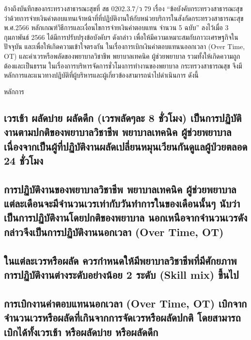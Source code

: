 อ้างถึงบันทึกของกระทรวงสาธารณะสุขที่ สธ 0202.3.7/ว 79 เรื่อง “ข้อบังคับกระทรวงสาธารณะสุขว่าด้วยการจ่ายเงินค่าตอบแทนเจ้าหน้าที่ที่ปฏิบัติงานให้กับหน่วยบริการในสังกัดกระทรวงสาธารณะสุข พ.ศ.2566 หลักเกณฑ์วิธีการและเงื่อนไขการจ่ายเงินค่าตอบแทน จำนวน 5 ฉบับ” ลงไว้เมื่อ 3 กุมภาพันธ์ 2566 ได้มีการปรับปรุงข้อบังคับฯ ดังกล่าว เพื่อให้มีความเหมาะสมกับภาวะเศรษฐกิจในปัจจุบัน และเพื่อให้เกิดความเข้าใจตรงกัน ในเรื่องการเบิกเงินค่าตอบแทนนออกเวลา (Over Time, OT) และค่าเวรหรือพลัดของพยาบาลวิชาชีพ พยาบาลเทคนิค ผู้ช่วยพยาบาล รวมทั้งให้เกิดความถูกต้องและเป็นธรรม ในเรื่องการบริหารจัดการชั่วโมงการทำงานของพยาบาล กระทรวงสาธารณสุข จึงมีหลักการและแนวทางปฎิบัติที่ผู้บริหารและผู้เกี่ยวข้องสามารถนำไปดำเนินการ ดังนี้

หลักการ


\hspace{0.5cm}\hangindent=2.7cm\subsection{เวรเช้า ผลัดบ่าย ผลัดดึก (เวรพลัดๆละ 8 ชั่วโมง) เป็นการปฏิบัติงานตามปกติของพยาบาลวิชาชีพ พยาบาลเทคนิค ผู้ช่วยพยาบาล เนื่องจากเป็นผู้ที่ปฏิบัติงานผลัดเปลี่ยนหมุนเวียนกันดูแลผู้ป่วยตลอด 24 ชั่วโมง}

\hspace{0.5cm}\hangindent=2.7cm\subsection{การปฏิบัติงานของพยาบาลวิชาชีพ พยาบาลเทคนิค ผู้ช่วยพยาบาล แต่ละเดือนจะมีจำนวนเวรเท่ากับวันทำการในของเดือนนั้นๆ นับว่าเป็นการปฏิบัติงานโดยปกติของพยาบาล นอกเหนือจากจำนวนเวรดังกล่าวจึงเป็นการปฏิบัติงานนอกเวลา (Over Time, OT)}

\hspace{0.5cm}\hangindent=2.7cm\subsection{ในแต่ละเวรหรือผลัด ควรกำหนดให้มีพยาบาลวิชาชีพที่มีศักยภาพการปฏิบัติงานต่างระดับอย่างน้อย 2 ระดับ (Skill mix) ขึ้นไป}

\hspace{0.5cm}\hangindent=2.7cm\subsection{การเบิกงานค่าตอบแทนนอกเวลา (Over Time, OT) เบิกจากจำนวนเวรหรือผลัดที่เกินจากการจัดเวรหรือผลัดปกติ โดยสามารถเบิกได้ทั้งเวรเช้า หรือผลัดบ่าย หรือผลัดดึก}

